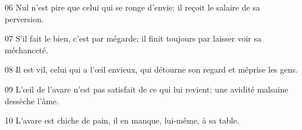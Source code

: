 
06 Nul n’est pire que celui qui se ronge d’envie: il reçoit le salaire de sa perversion.

07 S’il fait le bien, c’est par mégarde; il finit toujours par laisser voir sa méchanceté.

08 Il est vil, celui qui a l’œil envieux, qui détourne son regard et méprise les gens.

09 L’œil de l’avare n’est pas satisfait de ce qui lui revient; une avidité malsaine dessèche l’âme.

10 L’avare est chiche de pain, il en manque, lui-même, à sa table.
